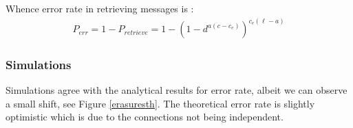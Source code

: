 \documentclass[english,10pt,twocolumn]{IEEEtran}
\theoremstyle{definition}
\begin{document}
	Whence error rate in retrieving messages is : 
	\begin{align}	
		P_{err} = 1 - P_{retrieve} = 1 - \left(1 - d^	{a(c-c_e)}\right)^{c_e(\ell-a)} 
	\end{align}	 
	
	
	
	
	
	
	
	\subsubsection{Simulations}
		
		
		Simulations agree with the analytical results for error rate, albeit we can observe a small shift, see Figure \ref{erasuresth}. The theoretical error rate is slightly optimistic which is due to the connections not being independent.
		
\end{document}
